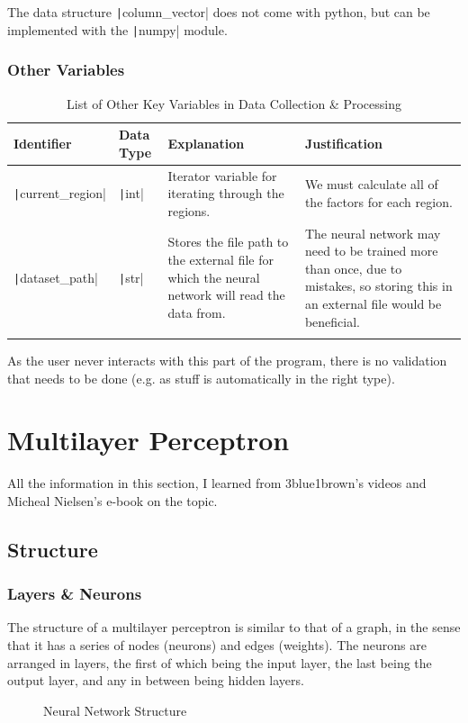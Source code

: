 \documentclass[12pt]{report}
\newcommand{\nodetext}[2]{$a^{\left(#1\right)}_#2$}
\newcommand{\pil}[1]{\texttt|#1|}
\begin{document}
The data structure \pil{column_vector} does not come with python, but can be implemented with the \pil{numpy} module.

\subsubsection{Other Variables}
\begin{center}
\begin{longtable}{ | m{3cm} | m{4cm}| m{4cm} | m{4cm} |} 
    \hline
    \textbf{Identifier} & \textbf{Data Type} & \textbf{Explanation}  & \textbf{Justification} \\ 
    \hline
    \pil{current_region} & \pil{int} & Iterator variable for iterating through the regions. & We must calculate all of the factors for each region. \\ 
    \hline
    \pil{dataset_path} & \pil{str} & Stores the file path to the external file for which the neural network will read the data from. & The neural network may need to be trained more than once, due to mistakes, so storing this in an external file would be beneficial. \\ 
    \hline
\caption{List of Other Key Variables in Data Collection \& Processing}
\end{longtable}
\end{center}

As the user never interacts with this part of the program, there is no validation that needs to be done (e.g. as stuff is automatically in the right type).

\section{Multilayer Perceptron}\label{sec:mlp}
All the information in this section, I learned from 3blue1brown's videos \cite{3blue1brown} and Micheal Nielsen's e-book \cite{backpropogation} on the topic.
\subsection{Structure}\label{sec:mlpStruct}
\subsubsection{Layers \& Neurons}
The structure of a multilayer perceptron is similar to that of a graph, in the sense that it has a series of nodes (neurons) and edges (weights). The neurons are arranged in layers, the first of which being the input layer, the last being the output layer, and any in between being hidden layers.
\begin{figure}[H]
\centering
\begin{neuralnetwork}[nodespacing=15mm,layerspacing=30mm]
\inputlayer[count=5, title=Input Layer, text=\nodetext, bias=false]
\hiddenlayer[count=4, title=Hidden Layer 1, text=\nodetext, bias=false] \linklayers
\hiddenlayer[count=4, title=Hidden Layer 2, text=\nodetext, bias=false] \linklayers
\outputlayer[count=1, title=Output Layer, text=\nodetext, bias=false] \linklayers
\end{neuralnetwork}
\caption{Neural Network Structure}\label{fig:nnStructure}
\end{figure}
\end{document}
